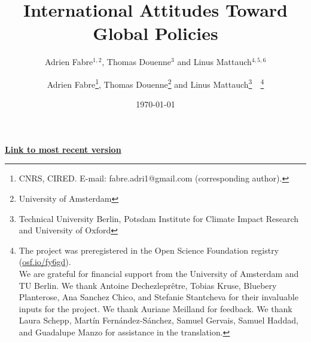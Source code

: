 % 


\title{International Attitudes Toward Global Policies %
} 

\author{Adrien Fabre$^{1,2}$, Thomas Douenne$^3$ and Linus Mattauch$^{4,5,6}$} %
\author{Adrien Fabre\footnote{CNRS, CIRED. E-mail: fabre.adri1@gmail.com (corresponding author).}, Thomas Douenne\footnote{University of Amsterdam}\; and Linus Mattauch\footnote{Technical University Berlin, Potsdam Institute for Climate Impact Research and University of Oxford}~~\thanks{The project %
was preregistered in the Open Science Foundation registry (\href{https://osf.io/fy6gd}{osf.io/fy6gd}). \\ We are grateful for financial support from the University of Amsterdam and TU Berlin. %
We thank Antoine Dechezleprêtre, Tobias Kruse, Bluebery Planterose, Ana Sanchez Chico, and Stefanie Stantcheva for their invaluable inputs for the project. We thank Auriane Meilland for feedback. We thank Laura Schepp, Martín Fernández-Sánchez, Samuel Gervais, Samuel Haddad, and Guadalupe Manzo for assistance in the translation. }} %

\date{\today} %



\maketitle

\begin{center}
{\textbf{\href{https://github.com/bixiou/global_tax_attitudes/raw/main/paper/US1.pdf}{Link to most recent version}}}
\end{center}




